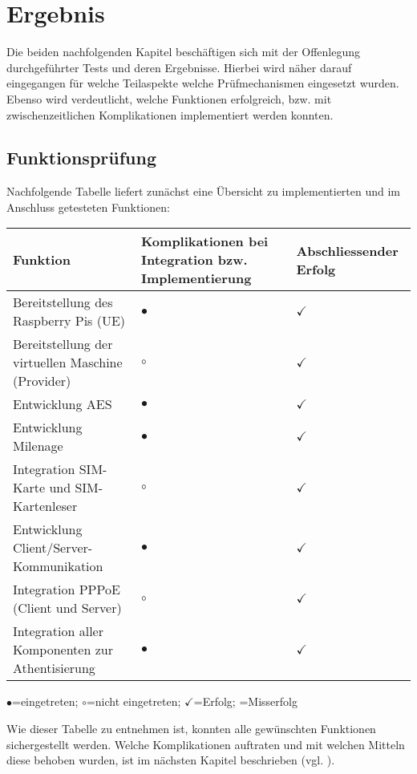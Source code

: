 \section{Ergebnis}
	Die beiden nachfolgenden Kapitel beschäftigen sich mit der Offenlegung durchgeführter Tests und deren Ergebnisse.
	Hierbei wird näher darauf eingegangen für welche Teilaspekte welche Prüfmechanismen
	eingesetzt wurden. Ebenso wird verdeutlicht, welche Funktionen erfolgreich, bzw.
	mit zwischenzeitlichen Komplikationen implementiert werden konnten.

	\subsection{Funktionsprüfung}
	\label{ergebnis-tests}
	Nachfolgende Tabelle liefert zunächst eine Übersicht zu implementierten und im Anschluss
	getesteten Funktionen:

	\begin{tabularx}{\textwidth}{|X||X|X|}
    \hline
      \textbf{Funktion} & \textbf{Komplikationen bei Integration bzw. Implementierung} & \textbf{Abschliessender Erfolg} \\
    \hline
    \hline
     	Bereitstellung des Raspberry Pis (UE) & $\bullet$ & $\checkmark$ \\
    \hline
    \hline
     	Bereitstellung der virtuellen Maschine (Provider) & $\circ$ & $\checkmark$ \\
    \hline
    \hline
     	Entwicklung AES & $\bullet$ & $\checkmark$ \\
    \hline
    \hline
    	Entwicklung Milenage & $\bullet$ & $\checkmark$ \\
    \hline
    \hline
    	Integration SIM-Karte und SIM-Kartenleser & $\circ$ & $\checkmark$ \\
    \hline
    \hline
    	Entwicklung Client/Server-Kommunikation & $\bullet$ & $\checkmark$ \\
    \hline
    \hline
    	Integration PPPoE (Client und Server) & $\circ$ & $\checkmark$ \\
    \hline
    \hline
    	Integration aller Komponenten zur Athentisierung & $\bullet$ & $\checkmark$ \\
    \hline
    \end{tabularx}

    $\bullet$=eingetreten; $\circ$=nicht eingetreten; $\checkmark$=Erfolg; =Misserfolg

    Wie dieser Tabelle zu entnehmen ist, konnten alle gewünschten Funktionen sichergestellt werden.
    Welche Komplikationen auftraten und mit welchen Mitteln diese behoben wurden, ist im
    nächsten Kapitel beschrieben (vgl. ).


